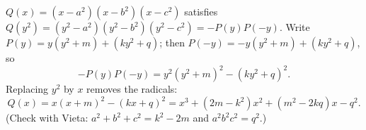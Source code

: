 $Q(x)=(x-a^2)(x-b^2)(x-c^2)$ satisfies $Q(y^2)=(y^2-a^2)(y^2-b^2)(y^2-c^2)=-P(y)P(-y)$. Write $P(y)=y(y^2+m)+(ky^2+q)$; then $P(-y)=-y(y^2+m)+(ky^2+q)$, so
\[-P(y)P(-y)=y^2(y^2+m)^2-(ky^2+q)^2.\]
Replacing $y^2$ by $x$ removes the radicals:
\[\boxed{Q(x)=x(x+m)^2-(kx+q)^2=x^3+(2m-k^2)x^2+(m^2-2kq)x-q^2}.\]
(Check with Vieta: $a^2+b^2+c^2=k^2-2m$ and $a^2b^2c^2=q^2$.)
